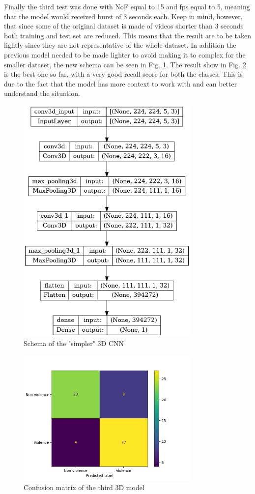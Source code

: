 Finally the third test was done with NoF equal to 15 and fps equal to 5, meaning that the model would received burst of 3 seconds each. Keep in mind, however, that since some of the original dataset is made of videos shorter than 3 seconds both training and test set are reduced. This means that the result are to be taken lightly since they are not representative of the whole dataset. In addition the previous model needed to be made lighter to avoid making it to complex for the smaller dataset, the new schema can be seen in Fig. \ref{fig:3D3CNNschema}. The result show in Fig. \ref{fig:Third3DCNNconfusionMatrix} is the best one so far, with a very good recall score for both the classes. This is due to the fact that the model has more context to work with and can better understand the situation.

\begin{figure}[]
    \centering
    \includegraphics[width=0.8\textwidth, height=0.6\textwidth, keepaspectratio]{images/3D9CNNschema.png}
    \caption{Schema of the "simpler" 3D CNN}
    \label{fig:3D3CNNschema}
\end{figure}


\begin{figure}[]
    \centering
    \includegraphics[width=0.8\textwidth]{images/71d5-testGiacomo3D3-9fcf-conf_matrix.png}
    \caption{Confusion matrix of the third 3D model}
    \label{fig:Third3DCNNconfusionMatrix}
\end{figure}



